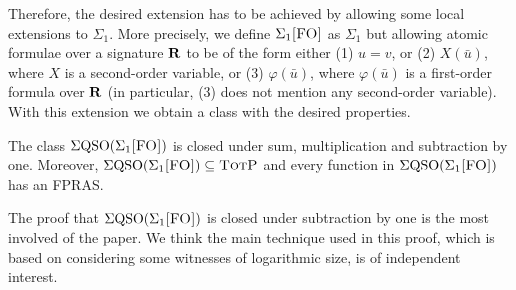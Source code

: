 Therefore, the desired extension has to be achieved by allowing some local extensions to $\Sigma_1$. More precisely, we define $\Sigma_{1}\textsc{[FO]}$ as $\Sigma_1$ but allowing atomic formulae over a signature $\mathbf{R}$ to be of the form either (1) $u = v$, or (2) $X(\bar u)$, where $X$ is a second-order variable, or (3) $\varphi(\bar u)$, where $\varphi(\bar u)$ is a first-order formula over $\mathbf{R}$ (in particular, (3) does not mention any second-order variable). With this extension we obtain a class with the desired properties.
\begin{theorem}\label{sigmafo-minusone}
The class $\Sigma{\rm QSO}(\Sigma_{1}\textsc{[FO]})$ is closed under sum, multiplication and subtraction by one. Moreover, $\Sigma{\rm QSO}(\Sigma_{1}\textsc{[FO]}) \subseteq \text{\sc TotP}$ and every function in $\Sigma{\rm QSO}(\Sigma_{1}\textsc{[FO]})$ has an FPRAS.
\end{theorem}
The proof that $\Sigma{\rm QSO}(\Sigma_{1}\textsc{[FO]})$ is closed under subtraction by one is the most involved of the paper. We think the main technique used in this proof, which is based on considering some witnesses of logarithmic size, is of independent interest. 


%



